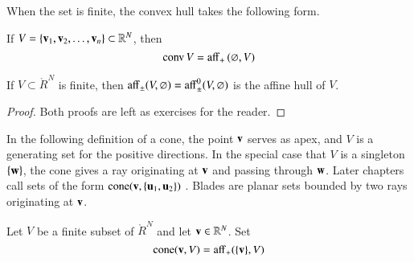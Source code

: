 When the set is finite, the convex hull takes the following form.

\begin{lemma}[]
If $V = \{{\mathbf v}_1,{\mathbf v}_2,\ldots,{\mathbf v}_n\}\subset\mathbb{R}^N$, then
	\begin{displaymath}
{\operatorname{conv}}\, V = {\operatorname{aff}}_+\, (\varnothing,V)
\end{displaymath}
%
%
\end{lemma}

\begin{lemma}[]
If $V\subset\ring{R}^N$ is finite, then
${\operatorname{aff}}_\pm (V,\varnothing) = {\operatorname{aff}}^0_\pm(V,\varnothing)$
is the affine hull of $V$.
\end{lemma}

\begin{proof}  Both proofs are left as  exercises for the reader.
\end{proof}

In the following definition of a cone, the point ${\mathbf v}$ serves as apex,
and $V$ is a generating set for the positive directions.  In the
special case that $V$ is a singleton $\{{\mathbf w}\}$, the cone gives a ray
originating at ${\mathbf v}$ and passing through ${\mathbf w}$.  Later chapters call
sets of the form ${\operatorname{cone}}({\mathbf v},\{{\mathbf u}_1,{\mathbf u}_2\})$ .
Blades are planar sets bounded by two rays originating at ${\mathbf v}$.
%
%
%

\begin{definition}[cone]
Let $V$ be a finite subset of
$\ring{R}^N$ and let ${\mathbf v}\in\mathbb{R}^N$. Set
\begin{displaymath}
{\operatorname{cone}}({\mathbf v},V) = {\operatorname{aff}}_+(\{{\mathbf v}\},V)
\end{displaymath}
%
%
\end{definition}




